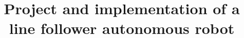 \documentclass[oneside,11pt]{normas-utf-tex} %
\title{{Project and implementation of a line follower autonomous robot}} %
\begin{document}
\capa %
\folhaderosto %







\listadefiguras %
\listadesiglas %

\sumario %









%


\clearpage %

\label{bibstart}
%
\end{document}
